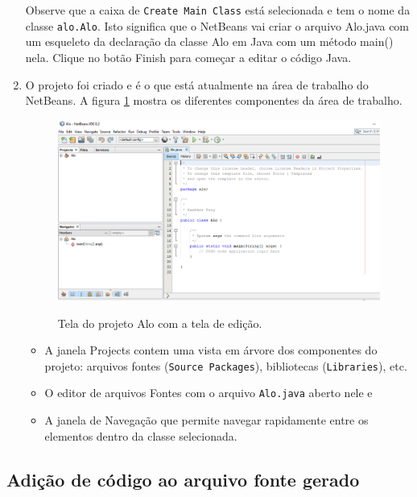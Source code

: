 \documentclass[
	12pt,				%
	twoside,			%
	a4paper,			%
	english,			%
	french,				%
	spanish,			%
	brazil				%
	]{abntex2}
\begin{document}
\begin{enumerate}
Observe que a caixa de \texttt{Create Main Class} está selecionada e tem o nome da classe \texttt{alo.Alo}. Isto significa que o NetBeans vai criar o arquivo Alo.java com um esqueleto da declaração da classe Alo em Java com um método main() nela. Clique no botão Finish para começar a editar o código Java.
\item O projeto foi criado e é o que está atualmente na área de trabalho do NetBeans. A figura \ref{fig:editScreen} mostra os diferentes componentes da área de trabalho.
\begin{figure}[h]
\begin{center}
\includegraphics[scale=0.27]{editScreen.png} 
\caption{Tela do projeto Alo com a tela de edição.}
\label{fig:editScreen}
\end{center}
\end{figure}

\begin{itemize}
\item A janela Projects contem uma vista em árvore dos componentes do projeto: arquivos fontes (\texttt{Source Packages}), bibliotecas (\texttt{Libraries}), etc.
\item O editor de arquivos Fontes com o arquivo \texttt{Alo.java} aberto nele e
\item A janela de Navegação que permite navegar rapidamente entre os elementos dentro da classe selecionada.
\end{itemize}

\end{enumerate}

\subsection{Adição de código ao arquivo fonte gerado}
\end{document}

